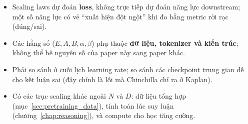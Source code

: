 \begin{tcolorbox}[title={Những giới hạn cần nhớ về scaling laws}, colback=red!5!white, colframe=red!75!black, fonttitle=\bfseries]
\begin{itemize}
	\item Scaling laws dự đoán \textbf{loss}, không trực tiếp dự đoán năng lực downstream; một số năng lực có vẻ “xuất hiện đột ngột” khi đo bằng metric rời rạc (đúng/sai).
	\item Các hằng số ($E, A, B, \alpha, \beta$) phụ thuộc \textbf{dữ liệu, tokenizer và kiến trúc}; không thể bê nguyên số của paper này sang paper khác.
	\item Phải so sánh ở cuối lịch learning rate; so sánh các checkpoint trung gian dễ cho kết luận sai (đây chính là lỗi mà Chinchilla chỉ ra ở Kaplan).
	\item Có các trục scaling khác ngoài $N$ và $D$: dữ liệu tổng hợp (mục~\ref{sec:pretraining_data}), tính toán lúc suy luận (chương~\ref{chap:reasoning}), và compute cho học tăng cường.
\end{itemize}
\end{tcolorbox}

